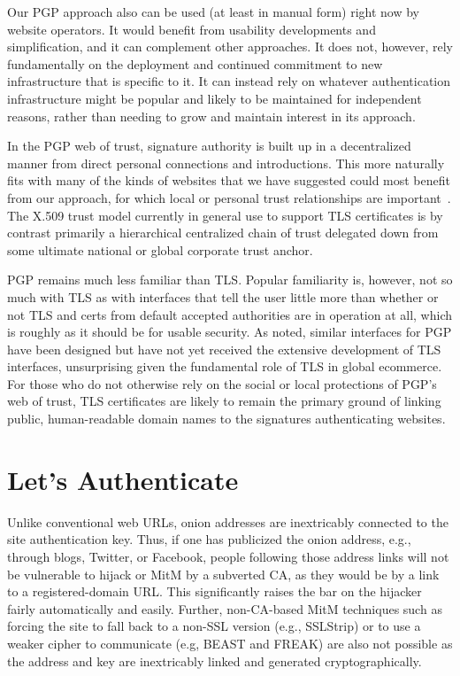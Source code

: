 \documentclass[10pt]{styles/IEEEtran}
\begin{document}
Our PGP approach also can be used (at least in manual form) right now by
website operators. It would benefit from usability developments
and simplification, and it can complement other approaches. It does not,
however,
rely fundamentally on the deployment and continued commitment to new
infrastructure that is specific to it.  It can instead
rely on whatever authentication infrastructure might be popular
and likely to be maintained for independent reasons, rather than
needing to grow and maintain interest in its approach.

In the PGP web of trust, signature authority is built up in a
decentralized manner from direct personal connections and
introductions. This more naturally fits with many of the kinds of
websites that we have suggested could most benefit from our approach,
for which local or personal trust relationships are
important~\cite{zimmerman}.  The X.509 trust model currently in
general use to support TLS certificates is by contrast primarily a
hierarchical centralized chain of trust delegated down from some
ultimate national or global corporate trust anchor.

PGP remains much less familiar than
TLS\@. Popular familiarity is, however, not so much with TLS as with
interfaces that tell the user little more than whether or not TLS 
and certs from default accepted authorities are
in operation at all, which is roughly as it should be for usable
security. As noted, similar interfaces for PGP have been designed but
have not yet received the extensive development of TLS interfaces,
unsurprising given the fundamental role of TLS in global ecommerce.
For those who do not otherwise rely on the social or local protections
of PGP's web of trust, TLS certificates are likely to remain the
primary ground of linking public, human-readable domain names to the
signatures authenticating websites.


\section{Let's Authenticate}
\label{lets-auth}

Unlike conventional web URLs, onion addresses are inextricably
connected to the site authentication key. Thus, if one has
publicized the onion address, e.g., through blogs, Twitter, or
Facebook, people following those address links will not be vulnerable
to hijack or MitM by a subverted CA, as they would be by a link
to a registered-domain URL\@. 
This significantly raises the bar on the hijacker
fairly automatically and easily. Further, non-CA-based MitM techniques
such as forcing the site to fall back to a non-SSL version (e.g.,
SSLStrip) or to use a weaker cipher to communicate (e.g, BEAST and
FREAK) are also not possible as the address and key are inextricably
linked and generated cryptographically. 
\end{document}
